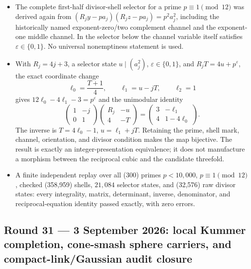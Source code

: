 \begin{itemize}[leftmargin=1.8em]
\item The complete first-half divisor-shell selector for a prime
\(p\equiv1\pmod{12}\) was derived again from
\((R_jy-pa_j)(R_jz-pa_j)=p^2a_j^2\), including the historically named
exponent-zero/two complement channel and the exponent-one middle channel.
In the selector below the channel variable itself satisfies
\(\varepsilon\in\{0,1\}\).  No universal
nonemptiness statement is used.

\item With \(R_j=4j+3\), a selector state \(u\mid(a_j^2)\),
\(\varepsilon\in\{0,1\}\), and
\(R_jT=4u+p^\varepsilon\), the exact coordinate change
\[
 \ell_0=\frac{T+1}{4},\qquad \ell_1=u-jT,\qquad \ell_2=1
\]
gives \(12\ell_0-4\ell_1-3=p^\varepsilon\) and the unimodular identity
\[
 \begin{pmatrix}1&-j\\0&1\end{pmatrix}
 \begin{pmatrix}R_j&-u\\4&-T\end{pmatrix}
 =\begin{pmatrix}3&-\ell_1\\4&1-4\ell_0\end{pmatrix}.
\]
The inverse is \(T=4\ell_0-1\), \(u=\ell_1+jT\).  Retaining the prime,
shell mark, channel, orientation, and divisor condition makes the map
bijective.  The result is exactly an integer-presentation equivalence; it
does not manufacture a morphism between the reciprocal cubic and the
candidate threefold.

\item A finite independent replay over all (300) primes
\(p<10{,}000\), \(p\equiv1\pmod{12}\), checked (358{,}959) shells,
\(21{,}084\) selector states, and (32{,}576) raw divisor states: every
integrality, matrix, determinant, inverse, denominator, and
reciprocal-equation identity passed exactly, with zero errors.
\end{itemize}

\subsection*{Round 31 --- 3 September 2026: local Kummer completion,
cone-smash sphere carriers, and compact-link/Gaussian audit closure}

